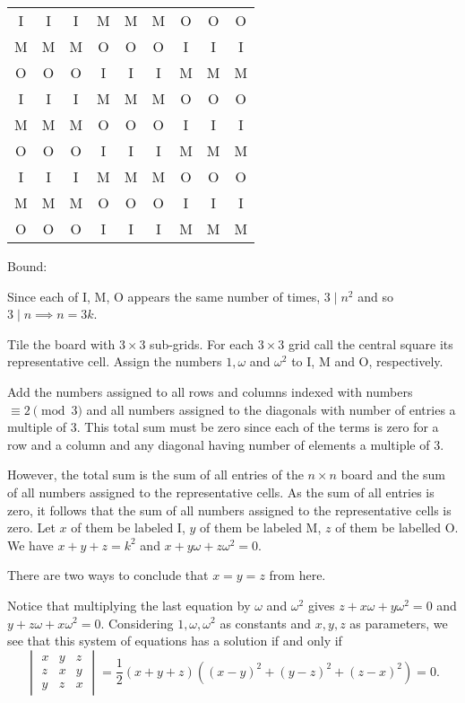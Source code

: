 \renewcommand{\arraystretch}{1.5}
\begin{center}
    \begin{tabular}{|ccc|ccc|ccc|}
        \hline
        I & I & I & M & M & M & O & O & O \\
        M & M & M & O & O & O & I & I & I \\
        O & O & O & I & I & I & M & M & M \\ \hline
        I & I & I & M & M & M & O & O & O \\
        M & M & M & O & O & O & I & I & I \\
        O & O & O & I & I & I & M & M & M \\ \hline
        I & I & I & M & M & M & O & O & O \\
        M & M & M & O & O & O & I & I & I \\
        O & O & O & I & I & I & M & M & M \\
        \hline
    \end{tabular}
\end{center}
\renewcommand{\arraystretch}{1}

Bound:

Since each of I, M, O appears the same number of times, $3\mid n^2$ and so $3\mid n\implies n=3k$.

Tile the board with $3\times 3$ sub-grids. For each $3\times 3$ grid call the central square its representative cell. Assign the numbers $1, \omega$ and $\omega^2$ to I, M and O, respectively.

Add the numbers assigned to all rows and columns indexed with numbers $\equiv 2 \pmod{3}$ and all numbers assigned to the diagonals with number of entries a multiple of 3. This total sum must be zero since each of the terms is zero for a row and a column and any diagonal having number of elements a multiple of 3.

However, the total sum is the sum of all entries of the $n\times n$ board and the sum of all numbers assigned to the representative cells. As the sum of all entries is zero, it follows that the sum of all numbers assigned to the representative cells is zero. Let $x$ of them be labeled I, $y$ of them be labeled M, $z$ of them be labelled O. We have $x+y+z=k^2$ and $x+y\omega+z\omega^2=0$.

There are two ways to conclude that $x=y=z$ from here.

Notice that multiplying the last equation by $\omega$ and $\omega^2$ gives $z+x\omega+y\omega^2=0$ and $y+z\omega+x\omega^2=0$. Considering $1, \omega, \omega^2$ as constants and $x, y, z$ as parameters, we see that this system of equations has a solution if and only if \[\begin{vmatrix}x&y&z\\z&x&y\\y&z&x\end{vmatrix}=\frac{1}{2}(x+y+z)\left((x-y)^2+(y-z)^2+(z-x)^2\right)=0.\]

